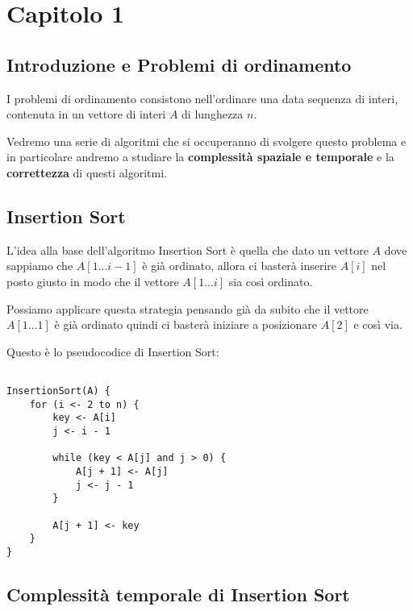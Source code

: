 \section{Capitolo 1}

\subsection{Introduzione e Problemi di ordinamento}

\begin{flushleft}

I problemi di ordinamento consistono nell'ordinare una data sequenza di interi, contenuta in un vettore
di interi $A$ di lunghezza $n$.

Vedremo una serie di algoritmi che si occuperanno di svolgere questo problema e in particolare andremo
a studiare la \textbf{complessità spaziale e temporale} e la \textbf{correttezza} di questi algoritmi.

\end{flushleft}

\subsection{Insertion Sort}

\begin{flushleft}

L'idea alla base dell'algoritmo Insertion Sort è quella che dato un vettore $A$ dove sappiamo che
$A[1 ... i-1]$ è già ordinato, allora ci basterà inserire $A[i]$ nel posto giusto in modo che il
vettore $A[1 ... i]$ sia così ordinato.

Possiamo applicare questa strategia pensando già da subito che il vettore $A[1 ... 1]$ è già ordinato
quindi ci basterà iniziare a posizionare $A[2]$ e così via.

Questo è lo pseudocodice di Insertion Sort:

\begin{lstlisting}

InsertionSort(A) {
	for (i <- 2 to n) {
		key <- A[i]
		j <- i - 1
		
		while (key < A[j] and j > 0) {
			A[j + 1] <- A[j]
			j <- j - 1
		}
		
		A[j + 1] <- key
	}
}

\end{lstlisting}
\end{flushleft}

\subsection{Complessità temporale di Insertion Sort}

